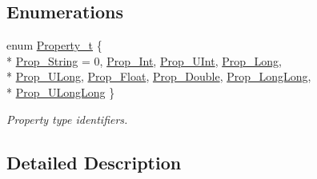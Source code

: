 \subsection*{Enumerations}
\begin{DoxyCompactItemize}
\item 
enum \hyperlink{group___property_classes_ga38f1ccddda12c7cb50b868c9f789ee37}{Property\-\_\-t} \{ \\*
\hyperlink{group___property_classes_gga38f1ccddda12c7cb50b868c9f789ee37a54096075ee9bf1c6f2e44ad7cea76260}{Prop\-\_\-\-String} = 0, 
\hyperlink{group___property_classes_gga38f1ccddda12c7cb50b868c9f789ee37aebb523c385feb37fcde4c6d7073224b7}{Prop\-\_\-\-Int}, 
\hyperlink{group___property_classes_gga38f1ccddda12c7cb50b868c9f789ee37ac42814aa5ea34e3b019db068494eed4d}{Prop\-\_\-\-U\-Int}, 
\hyperlink{group___property_classes_gga38f1ccddda12c7cb50b868c9f789ee37a48c7c9a2c7bf7b44ae8d4493b5122925}{Prop\-\_\-\-Long}, 
\\*
\hyperlink{group___property_classes_gga38f1ccddda12c7cb50b868c9f789ee37a19c6a4ad42555fcc0e2fac1d50fd2035}{Prop\-\_\-\-U\-Long}, 
\hyperlink{group___property_classes_gga38f1ccddda12c7cb50b868c9f789ee37a002f0049641d4e6f52901f023ef44f0c}{Prop\-\_\-\-Float}, 
\hyperlink{group___property_classes_gga38f1ccddda12c7cb50b868c9f789ee37a63a9d61b306c5306a47c5126ebd7200e}{Prop\-\_\-\-Double}, 
\hyperlink{group___property_classes_gga38f1ccddda12c7cb50b868c9f789ee37a1a1448256ec42f662e39fe120b92073a}{Prop\-\_\-\-Long\-Long}, 
\\*
\hyperlink{group___property_classes_gga38f1ccddda12c7cb50b868c9f789ee37aeb9cf79aeea684f28a149fdcd0f593aa}{Prop\-\_\-\-U\-Long\-Long}
 \}
\begin{DoxyCompactList}\small\item\em Property type identifiers. \end{DoxyCompactList}\end{DoxyCompactItemize}


\subsection{Detailed Description}


